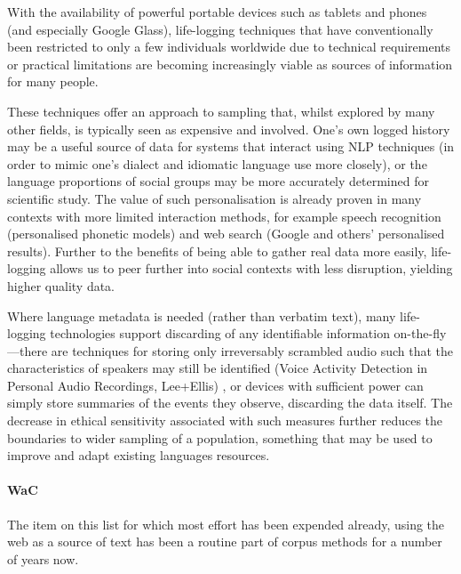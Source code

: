 With the availability of powerful portable devices such as tablets and phones (and especially Google Glass), life-logging techniques that have conventionally been restricted to only a few individuals worldwide due to technical requirements or practical limitations are becoming increasingly viable as sources of information for many people. 

These techniques offer an approach to sampling that, whilst explored by many other fields, is typically seen as expensive and involved.  One's own logged history may be a useful source of data for systems that interact using NLP techniques (in order to mimic one's dialect and idiomatic language use more closely), or the language proportions of social groups may be more accurately determined for scientific study.  The value of such personalisation is already proven in many contexts with more limited interaction methods, for example speech recognition (personalised phonetic models) and web search (Google and others' personalised results).  Further to the benefits of being able to gather real data more easily, life-logging allows us to peer further into social contexts with less disruption, yielding higher quality data.

Where language metadata is needed (rather than verbatim text), many life-logging technologies support discarding of any identifiable information on-the-fly---there are techniques for storing only irreversably scrambled audio such that the characteristics of speakers may still be identified (Voice Activity Detection in Personal Audio Recordings, Lee+Ellis)%
, or devices with sufficient power can simply store summaries of the events they observe, discarding the data itself.
The decrease in ethical sensitivity associated with such measures further reduces the boundaries to wider sampling of a population, something that may be used to improve and adapt existing languages resources.






\paragraph{WaC}
The item on this list for which most effort has been expended already, using the web as a source of text has been a routine part of corpus methods for a number of years now.

